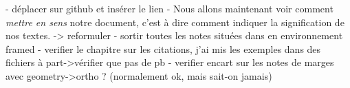- déplacer sur github et insérer le lien
- Nous allons maintenant voir comment \emph{mettre en sens} notre document, c'est à dire comment indiquer  la signification de nos textes. -> reformuler
- sortir toutes les notes situées dans en environnement framed
- verifier le chapitre sur les citations, j'ai mis les exemples dans des fichiers à part->vérifier que pas de pb
- verifier encart sur les notes de marges avec geometry->ortho ? (normalement ok, mais sait-on jamais)